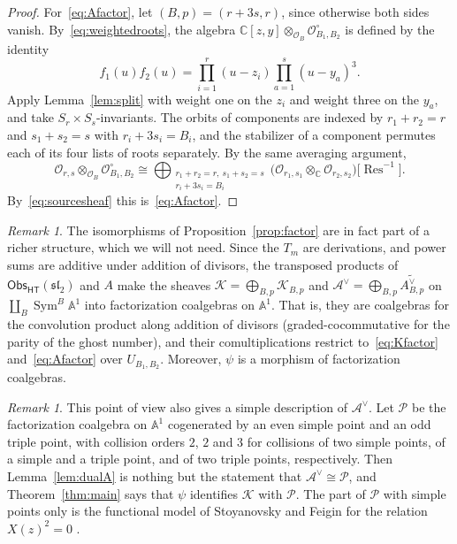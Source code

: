 \documentclass[11pt]{amsart}
\numberwithin{equation}{section}
\theoremstyle{definition}
\theoremstyle{remark}
\newtheorem{remark}[theorem]{Remark}
\newcommand{\C}{\mathbb{C}}
\newcommand{\A}{\mathbb{A}}
\newcommand{\sltwo}{\mathfrak{sl}_2}
\newcommand{\Obs}{\mathsf{Obs}_{\mathsf{HT}}}
\newcommand{\cO}{\mathcal{O}}
\newcommand{\cK}{\mathcal{K}}
\newcommand{\cA}{\mathcal{A}}
\newcommand{\Sym}{\operatorname{Sym}}
\newcommand{\Res}{\operatorname{Res}}
\begin{document}
\begin{proof}
For~\eqref{eq:Afactor}, let $(B,p)=(r+3s,r)$, since otherwise both sides vanish. By~\eqref{eq:weightedroots}, the algebra $\C[z,y]\otimes_{\cO_B}\cO^\circ_{B_1,B_2}$ is defined by the identity
\begin{equation}\label{eq:roots-identity}
f_1(u)f_2(u)=\prod_{i=1}^r(u-z_i)\prod_{a=1}^s(u-y_a)^3 .
\end{equation}
Apply Lemma~\ref{lem:split} with weight one on the $z_i$ and weight three on the $y_a$, and take $S_r\times S_s$-invariants. The orbits of components are indexed by $r_1+r_2=r$ and $s_1+s_2=s$ with $r_i+3s_i=B_i$, and the stabilizer of a component permutes each of its four lists of roots separately. By the same averaging argument,
\begin{equation}\label{eq:Ors-factor}
\cO_{r,s}\otimes_{\cO_B}\cO^\circ_{B_1,B_2}\cong\bigoplus_{\substack{r_1+r_2=r,\ s_1+s_2=s\\ r_i+3s_i=B_i}}\bigl(\cO_{r_1,s_1}\otimes_\C\cO_{r_2,s_2}\bigr)\bigl[\Res^{-1}\bigr].
\end{equation}
By~\eqref{eq:sourcesheaf} this is~\eqref{eq:Afactor}.
\end{proof}

\begin{remark}\label{rem:factorization}
The isomorphisms of Proposition~\ref{prop:factor} are in fact part of a richer structure, which we will not need. Since the $T_m$ are derivations, and power sums are additive under addition of divisors, the transposed products of $\Obs(\sltwo)$ and $A$ make the sheaves $\cK=\bigoplus_{B,p}\cK_{B,p}$ and $\cA^\vee=\bigoplus_{B,p}\widetilde{A^\vee_{B,p}}$ on $\coprod_B\Sym^B\A^1$ into factorization coalgebras on $\A^1$. That is, they are coalgebras for the convolution product along addition of divisors (graded-cocommutative for the parity of the ghost number), and their comultiplications restrict to~\eqref{eq:Kfactor} and~\eqref{eq:Afactor} over $U_{B_1,B_2}$. Moreover, $\psi$ is a morphism of factorization coalgebras.
\end{remark}

\begin{remark}\label{rem:dualA}
This point of view also gives a simple description of $\cA^\vee$. Let $\mathcal P$ be the factorization coalgebra on $\A^1$ cogenerated by an even simple point and an odd triple point, with collision orders $2$, $2$ and $3$ for collisions of two simple points, of a simple and a triple point, and of two triple points, respectively. Then Lemma~\ref{lem:dualA} is nothing but the statement that $\cA^\vee\cong\mathcal P$, and Theorem~\ref{thm:main} says that $\psi$ identifies $\cK$ with $\mathcal P$. The part of $\mathcal P$ with simple points only is the functional model of Stoyanovsky and Feigin for the relation $X(z)^2=0$ \cite{SF94}.
\end{remark}
\end{document}
